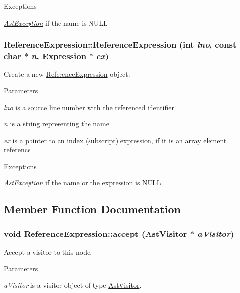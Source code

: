 \begin{DoxyExceptions}{Exceptions}
\item[{\em \hyperlink{classAstException}{AstException}}]if the name is NULL \end{DoxyExceptions}
\hypertarget{classReferenceExpression_a374d0940a132e2c36b96f502354822af}{
\subsubsection[{ReferenceExpression}]{\setlength{\rightskip}{0pt plus 5cm}ReferenceExpression::ReferenceExpression (int {\em lno}, \/  const char $\ast$ {\em n}, \/  {\bf Expression} $\ast$ {\em ex})}}
\label{classReferenceExpression_a374d0940a132e2c36b96f502354822af}
Create a new \hyperlink{classReferenceExpression}{ReferenceExpression} object.


\begin{DoxyParams}{Parameters}
\item[{\em lno}]is a source line number with the referenced identifier \item[{\em n}]is a string representing the name \item[{\em ex}]is a pointer to an index (subscript) expression, if it is an array element reference \end{DoxyParams}

\begin{DoxyExceptions}{Exceptions}
\item[{\em \hyperlink{classAstException}{AstException}}]if the name or the expression is NULL \end{DoxyExceptions}


\subsection{Member Function Documentation}
\hypertarget{classReferenceExpression_a5235ddeb368f790fd69b73dc1fe5a80e}{
\subsubsection[{accept}]{\setlength{\rightskip}{0pt plus 5cm}void ReferenceExpression::accept ({\bf AstVisitor} $\ast$ {\em aVisitor})}}
\label{classReferenceExpression_a5235ddeb368f790fd69b73dc1fe5a80e}
Accept a visitor to this node. 
\begin{DoxyParams}{Parameters}
\item[{\em aVisitor}]is a visitor object of type \hyperlink{classAstVisitor}{AstVisitor}. \end{DoxyParams}


